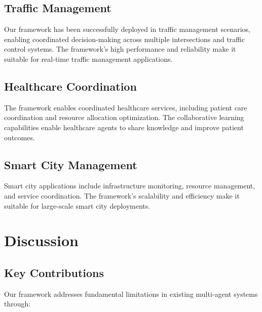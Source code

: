 \documentclass[conference]{IEEEtran}
\begin{document}
\subsection{Traffic Management}

Our framework has been successfully deployed in traffic management scenarios, enabling coordinated decision-making across multiple intersections and traffic control systems. The framework's high performance and reliability make it suitable for real-time traffic management applications.

\subsection{Healthcare Coordination}

The framework enables coordinated healthcare services, including patient care coordination and resource allocation optimization. The collaborative learning capabilities enable healthcare agents to share knowledge and improve patient outcomes.

\subsection{Smart City Management}

Smart city applications include infrastructure monitoring, resource management, and service coordination. The framework's scalability and efficiency make it suitable for large-scale smart city deployments.

\section{Discussion}

\subsection{Key Contributions}

Our framework addresses fundamental limitations in existing multi-agent systems through:
\end{document}

